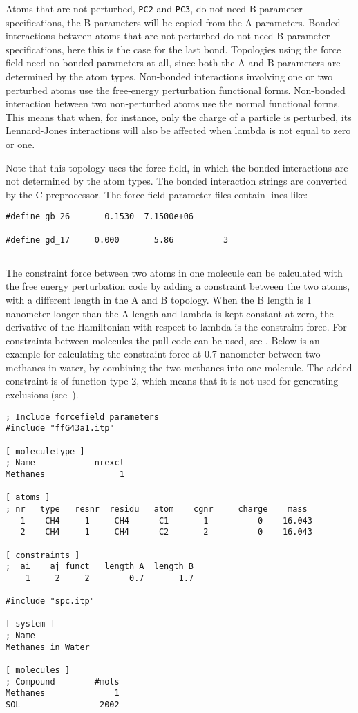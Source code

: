 Atoms that are not perturbed, {\tt PC2} and {\tt PC3}, do not need B parameter
specifications, the B parameters will be copied from the A parameters.
Bonded interactions between atoms that are not perturbed do not need B
parameter specifications, here this is the case for the last bond.
Topologies using the {\gromacs} force field need no bonded parameters at all,
since both the A and B parameters are determined by the atom types.
Non-bonded interactions involving one or two perturbed atoms use the 
free-energy perturbation functional forms.
Non-bonded interaction between two non-perturbed atoms use the normal
functional forms.
This means that when, for instance, only the charge of a particle is
perturbed, its Lennard-Jones interactions will also be affected when
lambda is not equal to zero or one.

Note that this topology uses the  force field, in which the bonded
interactions are not determined by the atom types. The bonded interaction
strings are converted by the C-preprocessor. The force field parameter
files contain lines like:
{\small\begin{verbatim}
#define gb_26       0.1530  7.1500e+06

#define gd_17     0.000       5.86          3
\end{verbatim}}

\subsection{}
\label{subsec:constraintforce}
The constraint force between two atoms in one molecule can be calculated
with the free energy perturbation code by adding a constraint between the
two atoms, with a different length in the A and B topology. When the B length
is 1 nanometer longer than the A length and lambda is kept constant at zero,
the derivative of the Hamiltonian with respect to lambda is the constraint
force. For constraints between molecules the pull code can be used,
see .
Below is an example for calculating the constraint force at 0.7 nanometer
between two methanes in water, by combining the two methanes into one molecule.
The added constraint is of function type 2, which means that it is not
used for generating exclusions (see~).
{\small\begin{verbatim}
; Include forcefield parameters
#include "ffG43a1.itp"

[ moleculetype ]
; Name            nrexcl
Methanes               1

[ atoms ]
; nr   type   resnr  residu   atom    cgnr     charge    mass
   1    CH4     1     CH4      C1       1          0    16.043
   2    CH4     1     CH4      C2       2          0    16.043

[ constraints ]
;  ai    aj funct   length_A  length_B
    1     2     2        0.7       1.7

#include "spc.itp"

[ system ]
; Name
Methanes in Water

[ molecules ]
; Compound        #mols
Methanes              1
SOL                2002
\end{verbatim}}

